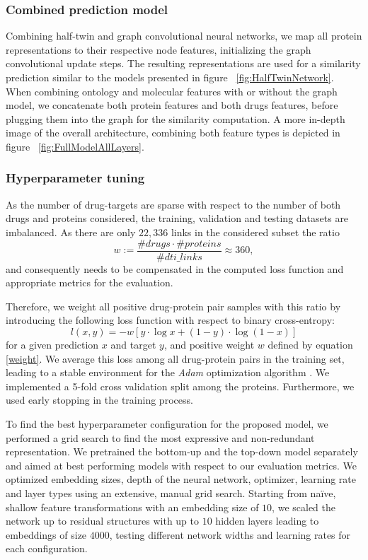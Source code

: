 \documentclass{bioinfo}
\begin{document}
\subsubsection{Combined prediction model}
Combining half-twin and graph convolutional neural networks, we map
all protein representations to their respective node features,
initializing the graph convolutional update steps. The resulting
representations are used for a similarity prediction similar
to the models presented in figure ~\ref{fig:HalfTwinNetwork}.
When combining ontology and molecular features with or without the
graph model, we concatenate both protein features and both drugs
features, before plugging them into the graph for the similarity
computation. A more in-depth image of the overall architecture,
combining both feature types is depicted in figure
~\ref{fig:FullModelAllLayers}.

\subsubsection{Hyperparameter tuning}
As the number of drug-targets are sparse with respect to the number of
both drugs and proteins considered, the training, validation and
testing datasets are imbalanced. As there are only $22,336$ links in
the considered subset the ratio
\begin{equation}
	w:= \frac{\#drugs \cdot \#proteins}{\#dti\_links} \approx 360,
	\label{weight}
\end{equation}
and consequently needs to be compensated in the computed loss function
and appropriate metrics for the evaluation.

Therefore, we weight all positive drug-protein pair samples with this
ratio by introducing the following loss function with respect to 
binary cross-entropy:
\begin{equation}
	l(x,y) = - w \left[ y \cdot \log x + (1 - y) \cdot \log (1 - x) \right]
\end{equation}
for a given prediction $x$ and target $y$, and positive weight $w$
defined by equation \eqref{weight}. We average this loss among all
drug-protein pairs in the training set, leading to a stable
environment for the \textit{Adam} optimization algorithm
\citep{Adam2014}. We implemented a 5-fold cross validation split among
the proteins. Furthermore, we used early stopping in the training
process.

To find the best hyperparameter configuration for the proposed model,
we performed a grid search to find the most expressive and
non-redundant representation. We pretrained the bottom-up and the
top-down model separately and aimed at best performing models
with respect to our evaluation metrics. We optimized embedding sizes,
depth of the neural network, optimizer, learning rate and layer types
using an extensive, manual grid search. Starting from na\"ive, shallow
feature transformations with an embedding size of $10$, we scaled the
network up to residual structures with up to $10$ hidden layers
leading to embeddings of size $4000$, testing different network widths
and learning rates for each configuration.
\end{document}
